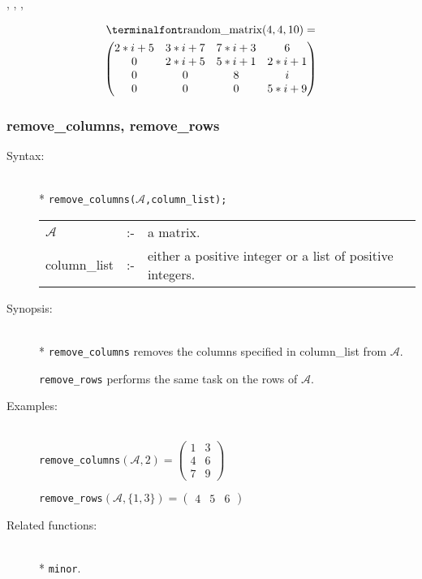\begin{description}
  , , , 

  \begin{multline*}
  \text{\var{random\_matrix}}(4,4,10) = \\
  \begin{pmatrix} 2*i+5 & 3*i+7 & 7*i+3 & 6 \\ 0 & 2*i+5 &
    5*i+1 & 2*i+1 \\ 0 & 0 & 8 & i \\ 0 & 0 & 0& 5*i+9
  \end{pmatrix}    
\end{multline*}
\end{description}


\subsubsection{remove\_columns, remove\_rows}
\label{linalg:remove_columns}
\hypertarget{operator:REMOVE_COLUMNS}{}

\begin{description}
\item[Syntax:]\mbox{}\\*
\texttt{remove\_columns($\mathcal{A}$,column\_list);}\\[2mm]
\begin{tabular}{l l l}
$\mathcal{A}$   &:-& a matrix. \\
column\_list &:-& either a positive integer or a list of
                  positive integers.
\end{tabular}

\item[Synopsis:]\mbox{}\\*
\texttt{remove\_columns} removes the columns specified in
                column\_list from $\mathcal{A}$.

\texttt{remove\_rows} performs the same task on the rows
                of $\mathcal{A}$.

\item[Examples:]\mbox{}\\
\texttt{remove\_columns}\((\mathcal{A},2) =
        \begin{pmatrix} 1 & 3 \\ 4 & 6 \\ 7 & 9  \end{pmatrix}\)

\texttt{remove\_rows}\((\mathcal{A},\{1,3\}) =
        \begin{pmatrix} 4 & 5 & 6 \end{pmatrix}\)

\item[Related functions:]\mbox{}\\*
\texttt{minor}.
\end{description}


